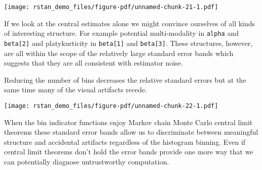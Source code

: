 \documentclass[
  letterpaper,
  DIV=11,
  numbers=noendperiod]{scrartcl}
\newenvironment{Shaded}{\begin{snugshade}}{\end{snugshade}}
\newcommand{\AttributeTok}[1]{\textcolor[rgb]{0.40,0.45,0.13}{#1}}
\newcommand{\DecValTok}[1]{\textcolor[rgb]{0.68,0.00,0.00}{#1}}
\newcommand{\FunctionTok}[1]{\textcolor[rgb]{0.28,0.35,0.67}{#1}}
\newcommand{\NormalTok}[1]{\textcolor[rgb]{0.00,0.23,0.31}{#1}}
\newcommand{\SpecialCharTok}[1]{\textcolor[rgb]{0.37,0.37,0.37}{#1}}
\newcommand{\StringTok}[1]{\textcolor[rgb]{0.13,0.47,0.30}{#1}}
\begin{document}
\texttt{[image: rstan\_demo\_files/figure-pdf/unnamed-chunk-21-1.pdf]}

If we look at the central estimates alone we might convince ourselves of
all kinds of interesting structure. For example potential multi-modality
in \texttt{alpha} and \texttt{beta{[}2{]}} and platykurticity in
\texttt{beta{[}1{]}} and \texttt{beta{[}3{]}}. These structures,
however, are all within the scope of the relatively large standard error
bands which suggests that they are all consistent with estimator noise.

Reducing the number of bins decreases the relative standard errors but
at the same time many of the visual artifacts recede.

\begin{Shaded}
\end{Shaded}

\texttt{[image: rstan\_demo\_files/figure-pdf/unnamed-chunk-22-1.pdf]}

When the bin indicator functions enjoy Markov chain Monte Carlo central
limit theorems these standard error bands allow us to discriminate
between meaningful structure and accidental artifacts regardless of the
histogram binning. Even if central limit theorems don't hold the error
bands provide one more way that we can potentially diagnose
untrustworthy computation.
\end{document}
